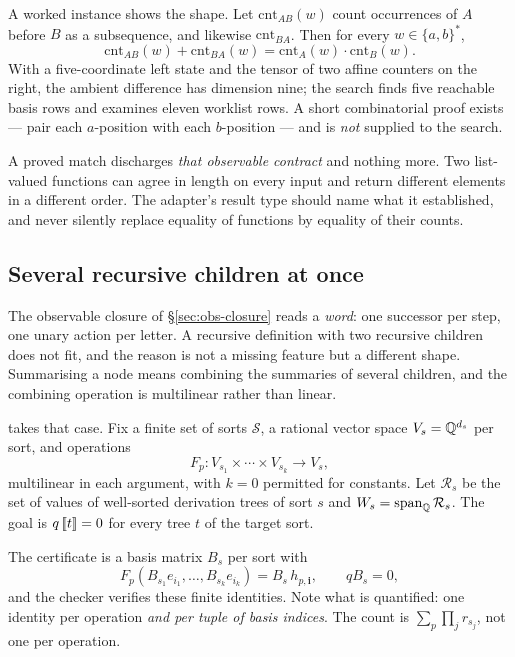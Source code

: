 A worked instance shows the shape. Let $\mathrm{cnt}_{AB}(w)$ count occurrences
of $A$ before $B$ as a subsequence, and likewise $\mathrm{cnt}_{BA}$. Then for
every $w\in\{a,b\}^{*}$,
\[
 \mathrm{cnt}_{AB}(w)+\mathrm{cnt}_{BA}(w)
 =\mathrm{cnt}_{A}(w)\cdot\mathrm{cnt}_{B}(w).
\]
With a five-coordinate left state and the tensor of two affine counters on the
right, the ambient difference has dimension nine; the search finds five
reachable basis rows and examines eleven worklist rows. A short combinatorial
proof exists --- pair each $a$-position with each $b$-position --- and is
\emph{not} supplied to the search.

\begin{remark}
A proved match discharges \emph{that observable contract} and nothing more.
Two list-valued functions can agree in length on every input and return
different elements in a different order. The adapter's result type should name
what it established, and never silently replace equality of functions by
equality of their counts.
\end{remark}

\subsection{Several recursive children at once}
\label{sec:multilinear}

The observable closure of \S\ref{sec:obs-closure} reads a \emph{word}: one
successor per step, one unary action per letter. A recursive definition with two
recursive children does not fit, and the reason is not a missing feature but a
different shape. Summarising a node means combining the summaries of several
children, and the combining operation is multilinear rather than linear.

 takes that case. Fix a finite set of sorts $\mathcal S$, a rational
vector space $V_s=\mathbb{Q}^{d_s}$ per sort, and operations
\[
 F_p:V_{s_1}\times\cdots\times V_{s_k}\longrightarrow V_s,
\]
multilinear in each argument, with $k=0$ permitted for constants. Let
$\mathcal R_s$ be the set of values of well-sorted derivation trees of sort $s$
and $W_s=\operatorname{span}_{\mathbb{Q}}\mathcal R_s$. The goal is $q\,\mathopen{[\![}t\mathclose{]\!]}=0$ for every tree $t$
of the target sort.

The certificate is a basis matrix $B_s$ per sort with
\begin{equation}\label{eq:multilinear}
 F_p(B_{s_1}e_{i_1},\ldots,B_{s_k}e_{i_k})=B_s\,h_{p,\bm i},
 \qquad qB_s=0,
\end{equation}
and the checker verifies these finite identities. Note what is quantified: one
identity per operation \emph{and per tuple of basis indices}. The count is
$\sum_p\prod_j r_{s_j}$, not one per operation.

